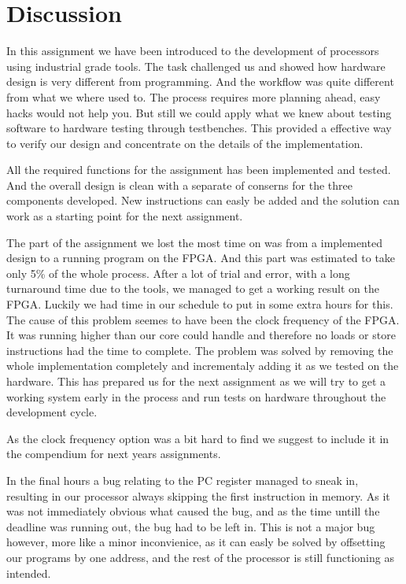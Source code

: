 \section{Discussion}

In this assignment we have been introduced to the development of processors using 
industrial grade tools. The task challenged us and showed how hardware design is
very different from programming. And the workflow was quite different from what we
where used to. The process requires more planning ahead, easy hacks would not help you.
But still we could apply what we knew about testing software to hardware testing 
through testbenches. This provided a effective way to verify our design and concentrate
on the details of the implementation. 

All the required functions for the assignment has been implemented and tested. And the
overall design is clean with a separate of conserns for the three components developed. 
New instructions can easly be added and the solution can work as a starting point for the
next assignment. 

The part of the assignment we lost the most time on was from a implemented design to a running
program on the FPGA. And this part was estimated to take only 5\% of the whole process. 
After a lot of trial and error, with a long turnaround time due to the tools, we managed to get 
a working result on the FPGA. Luckily we had time in our schedule to put in some extra hours for this.
The cause of this problem seemes to have been the clock frequency of the FPGA. It was running higher 
than our core could handle and therefore no loads or store instructions had the time to complete. 
The problem was solved by removing the whole implementation completely and incrementaly adding
it as we tested on the hardware. This has prepared us for the next assignment as we will try
to get a working system early in the process and run tests on hardware throughout the development
cycle. 

As the clock frequency option was a bit hard to find we suggest to include it in the compendium
for next years assignments. 

In the final hours a bug relating to the PC register managed to sneak in, resulting in our processor always skipping the
first instruction in memory. As it was not immediately obvious what caused the bug, and as the time untill the deadline was
running out, the bug had to be left in. This is not a major bug however, more like a minor inconvienice, as it can easly be 
solved by offsetting our programs by one address, and the rest of the processor is still functioning as intended.
